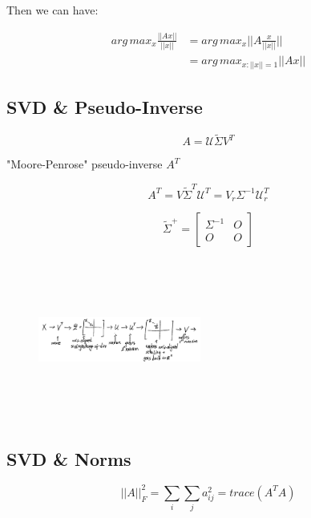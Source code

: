 Then we can have:

\begin{align*}
arg\, max_x\frac{||Ax||}{||x||} &= arg\, max_x||A\frac{x}{||x||}||\\
&= arg\, max_{x: ||x|| = 1}||Ax||
\end{align*}

\subsection{SVD \& Pseudo-Inverse}
\begin{equation*}
A = \mathcal{U}\tilde{\Sigma}V^T
\end{equation*}

"Moore-Penrose" pseudo-inverse $A^T$

\begin{equation*}
A^T = V\tilde{\Sigma}^T\mathcal{U}^T = V_r\Sigma^{-1}\mathcal{U}_r^T
\end{equation*}


$$ \tilde{\Sigma}^+ =   
\left[
\begin{matrix}
\Sigma^{-1} & O\\
O & O
\end{matrix}
\right]
$$


\begin{figure}
	\centering
	\includegraphics[width=2.1in,height=2.1in]{figures/ch05/figure3.png}
\end{figure}

\subsection{SVD \& Norms}

\begin{equation*}
||A||^2_F = \sum_i\sum_j a_{ij}^2 = trace(A^TA)
\end{equation*}

